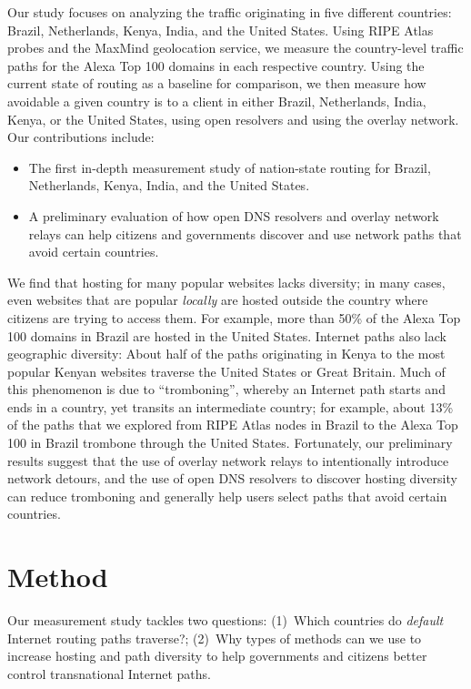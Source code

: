 Our study focuses on analyzing the traffic originating in
five different countries: Brazil, Netherlands, Kenya, India, and the
United States.  Using RIPE Atlas probes and the MaxMind geolocation
service, we measure the country-level traffic paths for the Alexa Top
100 domains in each respective country.  Using the current state of
routing as a baseline for comparison, we then measure how avoidable a
given country is to a client in either Brazil, Netherlands, India,
Kenya, or the United States, using open resolvers and using the overlay
network.  Our contributions include: 

\begin{itemize}
\item The first in-depth measurement study of
  nation-state routing for Brazil, Netherlands, Kenya, India, and the
  United States. 
\item A preliminary evaluation of how open DNS resolvers and overlay
  network relays can help citizens and governments discover and use
  network paths that avoid certain countries.
\end{itemize}
\noindent
We find that hosting for many popular websites lacks diversity; in many
cases, even websites that are popular {\em locally} are hosted outside
the country where citizens are trying to access them. For example, more
than 50\% of the Alexa Top 100 domains in Brazil are hosted in the
United States. Internet paths also lack geographic diversity: About half
of the paths originating in Kenya to the most popular Kenyan websites
traverse the United States or Great Britain. Much of this phenomenon is
due to ``tromboning'', whereby an Internet path starts and ends in a
country, yet transits an intermediate country; for example, about 13\%
of the paths that we explored from RIPE Atlas nodes in Brazil to the
Alexa Top 100 in Brazil trombone through the United States. Fortunately,
our preliminary results suggest that the use of overlay network relays
to intentionally introduce network detours, and the use of open DNS
resolvers to discover hosting diversity can reduce tromboning and
generally help users select paths that avoid certain countries.

\section{Method}

Our measurement study tackles two questions: (1)~Which countries do {\em
  default} Internet routing paths traverse?; (2)~Why types of methods
can we use to increase hosting and path diversity to help governments
and citizens better control transnational Internet paths.

